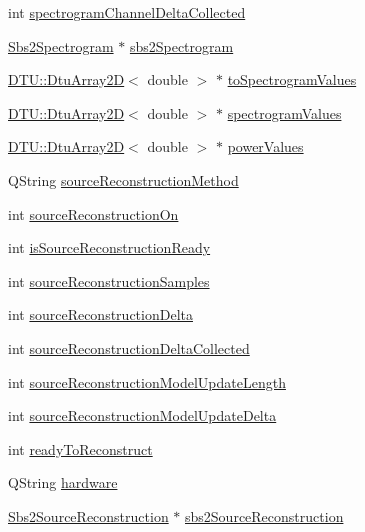 \begin{DoxyCompactItemize}
\item 
int \hyperlink{classSbs2DataHandler_a5f13f58b4c6fc3ef242c49526f632fb5}{spectrogram\-Channel\-Delta\-Collected}
\item 
\hyperlink{classSbs2Spectrogram}{Sbs2\-Spectrogram} $\ast$ \hyperlink{classSbs2DataHandler_a8f10be73e5dcf79ee2b17dc25b8c3ad3}{sbs2\-Spectrogram}
\item 
\hyperlink{classDTU_1_1DtuArray2D}{D\-T\-U\-::\-Dtu\-Array2\-D}$<$ double $>$ $\ast$ \hyperlink{classSbs2DataHandler_a2e2a930ac63df2480e02bfc2cc2d9c56}{to\-Spectrogram\-Values}
\item 
\hyperlink{classDTU_1_1DtuArray2D}{D\-T\-U\-::\-Dtu\-Array2\-D}$<$ double $>$ $\ast$ \hyperlink{classSbs2DataHandler_a71fb5afb898d4998d271c6812d3b13bc}{spectrogram\-Values}
\item 
\hyperlink{classDTU_1_1DtuArray2D}{D\-T\-U\-::\-Dtu\-Array2\-D}$<$ double $>$ $\ast$ \hyperlink{classSbs2DataHandler_a2e654257d666ee18603aa21ce4fc0094}{power\-Values}
\item 
Q\-String \hyperlink{classSbs2DataHandler_a7707e1c381de4da234da0e1a427ea943}{source\-Reconstruction\-Method}
\item 
int \hyperlink{classSbs2DataHandler_ac39dd9d7e16c5483c9c8264ab9fe3583}{source\-Reconstruction\-On}
\item 
int \hyperlink{classSbs2DataHandler_a27824cd8b891d39371317f6b71734bb9}{is\-Source\-Reconstruction\-Ready}
\item 
int \hyperlink{classSbs2DataHandler_a040c1f1987d1aedd9fc4fa0bb032793c}{source\-Reconstruction\-Samples}
\item 
int \hyperlink{classSbs2DataHandler_a518bfd8fdb83c367de2aad22d941e237}{source\-Reconstruction\-Delta}
\item 
int \hyperlink{classSbs2DataHandler_a9252e8ca95c93cf6040872fc63e5be2a}{source\-Reconstruction\-Delta\-Collected}
\item 
int \hyperlink{classSbs2DataHandler_a8fd8e83392c3e765248a1159ea7ab4f0}{source\-Reconstruction\-Model\-Update\-Length}
\item 
int \hyperlink{classSbs2DataHandler_ab73812b83ec8bf91093d35c706a524bc}{source\-Reconstruction\-Model\-Update\-Delta}
\item 
int \hyperlink{classSbs2DataHandler_a00267a9a5aeb1d0cc19c10d35bb74244}{ready\-To\-Reconstruct}
\item 
Q\-String \hyperlink{classSbs2DataHandler_a2aefd1effca8fce9a50d996a8904d3db}{hardware}
\item 
\hyperlink{classSbs2SourceReconstruction}{Sbs2\-Source\-Reconstruction} $\ast$ \hyperlink{classSbs2DataHandler_a0f5dcab81112672a955fe3571b27b257}{sbs2\-Source\-Reconstruction}

\end{DoxyCompactItemize}
